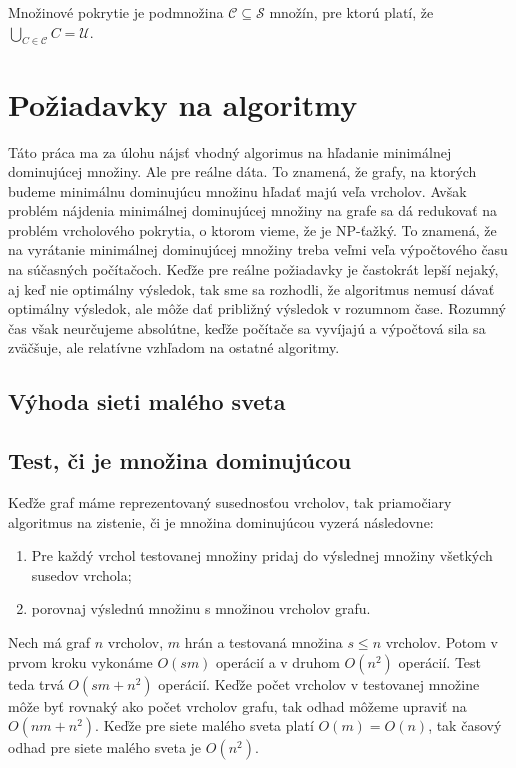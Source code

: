 Množinové pokrytie je podmnožina $\mathcal{C} \subseteq \mathcal{S}$ množín, 
pre ktorú platí, že $\bigcup_{C \in \mathcal{C}} C = \mathcal{U}$.

\section{Požiadavky na algoritmy}

Táto práca ma za úlohu nájsť vhodný algorimus na hľadanie minimálnej 
dominujúcej množiny. Ale pre reálne dáta. To znamená, že grafy, na ktorých 
budeme minimálnu dominujúcu množinu hľadať majú veľa vrcholov. Avšak problém 
nájdenia minimálnej dominujúcej množiny na grafe sa dá redukovať na problém 
vrcholového pokrytia, o ktorom vieme, že je NP-ťažký. To znamená, že na 
vyrátanie minimálnej dominujúcej množiny treba veľmi veľa výpočtového času na 
súčasných počítačoch. Keďže pre reálne požiadavky je častokrát lepší nejaký, 
aj keď nie optimálny výsledok, tak sme sa rozhodli, že algoritmus nemusí dávať 
optimálny výsledok, ale môže dať približný výsledok v rozumnom čase. Rozumný 
čas však neurčujeme absolútne, keďže počítače sa vyvíjajú a výpočtová sila sa 
zväčšuje, ale relatívne vzhľadom na ostatné algoritmy.

\subsection{Výhoda sieti malého sveta}


\subsection{Test, či je množina dominujúcou}

Keďže graf máme reprezentovaný susednosťou vrcholov, tak priamočiary algoritmus 
na zistenie, či je množina dominujúcou vyzerá následovne:

\begin{enumerate}
	\item Pre každý vrchol testovanej množiny pridaj do výslednej množiny 
všetkých susedov vrchola;
	\item porovnaj výslednú množinu s množinou vrcholov grafu.
\end{enumerate}

Nech má graf $n$ vrcholov, $m$ hrán a testovaná množina $s \leq n$ vrcholov. 
Potom v prvom kroku vykonáme $O(sm)$ operácií a v druhom $O(n^2)$ operácií. 
Test teda trvá $O(sm + n^2)$ operácií. Keďže počet vrcholov v testovanej 
množine môže byť rovnaký ako počet vrcholov grafu, tak odhad môžeme upraviť na 
$O(nm + n^2)$. Keďže pre siete malého sveta platí $O(m) = O(n)$, tak časový 
odhad pre siete malého sveta je $O(n^2)$.

